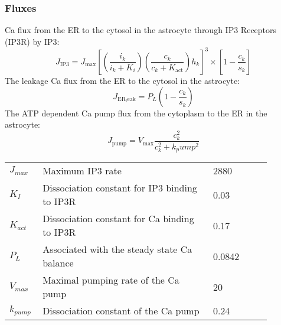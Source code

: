 \subsubsection{Fluxes}
\gls{Ca} flux from the ER to the cytosol in the astrocyte through \gls{IP3} Receptors (\gls{IP3}R) by \gls{IP3}: 
\begin{equation} \label{eq:J_ip3}
J_{\mathrm{IP3}}=J_{\mathrm{max}}[(\frac{i_k}{i_k+K_i})(\frac{c_k}{c_k+K_{\mathrm{act}}})h_k]^3\times [1-\frac{c_k}{s_k}] 
\end{equation}
%
The leakage \gls{Ca}  flux from the \gls{ER} to the cytosol in the astrocyte:
\begin{equation} \label{eq:J_ER_leak}
J_{\mathrm{ER_leak}} = P_L(1-\frac{c_k}{s_k})
\end{equation}	
%
The ATP dependent \gls{Ca}  pump flux from the cytoplasm to the ER in the astrocyte:
\begin{equation} \label{eq:J_pump}
J_{\mathrm{pump}} = V_{\mathrm{max}}\frac{c_k^2}{c_k^2+k_pump^2}
\end{equation}
\begin{table}[h!]
	\centering
	\begin{tabular}{| p{0.09\linewidth} | >{\footnotesize} p{0.6\linewidth} | >{\footnotesize} p{0.17\linewidth} | >{\footnotesize} p{0.02\linewidth} |}
		\arrayrulecolor{lightgrey}\hline	
		$J_{max}$       & Maximum \gls{IP3} rate                                                & 2880 \uMps        & \cite{Farr2011} \\  
		$K_I$           & Dissociation constant for \gls{IP3} binding to \gls{IP3}R             & 0.03 \uM          & \cite{Farr2011} \\ 
		$K_{act}$       & Dissociation constant for \gls{Ca} binding to \gls{IP3}R              & 0.17 \uM          & \cite{Farr2011} \\ 
		$P_L$           & Associated with the steady state \gls{Ca} balance                     & 0.0842 \uM           & \cite{LoesEvert} \\ 
		$V_{max}$       & Maximal pumping rate of the \gls{Ca} pump                             & 20 \uMps          & \cite{Farr2011} \\ 
		$k_{pump}$      & Dissociation constant of the \gls{Ca} pump                            & 0.24 \uM          & \cite{Farr2011} \\ 
		\hline
	\end{tabular}
\end{table}

